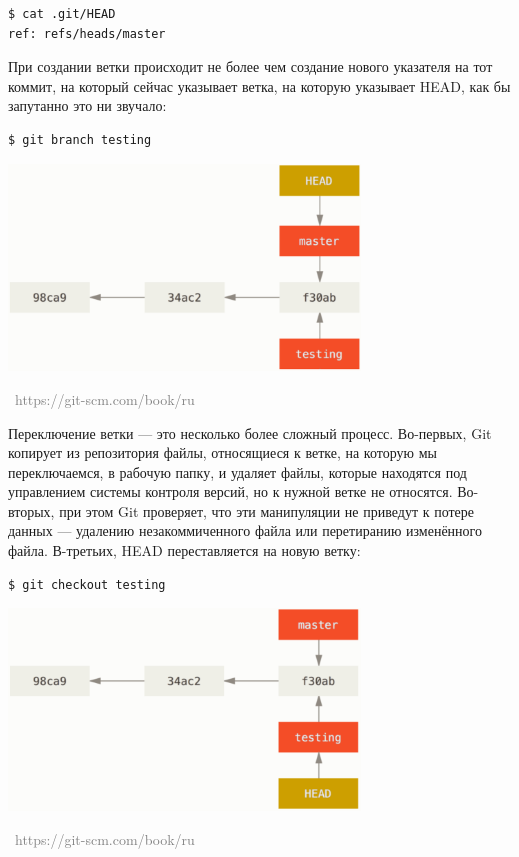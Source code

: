 \documentclass[a5paper]{article}
\newcommand{\attribution}[1] {
\vspace{-5mm}\begin{flushright}\begin{scriptsize}\textcolor{gray}{\textcopyright\, #1}\end{scriptsize}\end{flushright}
}
\begin{document}
\begin{verbatim}
$ cat .git/HEAD
ref: refs/heads/master
\end{verbatim}

При создании ветки происходит не более чем создание нового указателя на тот коммит, на который сейчас указывает ветка, на которую указывает HEAD, как бы запутанно это ни звучало:

\begin{verbatim}
$ git branch testing
\end{verbatim}

\begin{center}
	\includegraphics[width=0.7\textwidth]{creatingBranch.png}
	\attribution{https://git-scm.com/book/ru}
\end{center}

Переключение ветки --- это несколько более сложный процесс. Во-первых, Git копирует из репозитория файлы, относящиеся к ветке, на которую мы переключаемся, в рабочую папку, и удаляет файлы, которые находятся под управлением системы контроля версий, но к нужной ветке не относятся. Во-вторых, при этом Git проверяет, что эти манипуляции не приведут к потере данных --- удалению незакоммиченного файла или перетиранию изменённого файла. В-третьих, HEAD переставляется на новую ветку:

\begin{verbatim}
$ git checkout testing
\end{verbatim}

\begin{center}
	\includegraphics[width=0.7\textwidth]{checkout.png}
	\attribution{https://git-scm.com/book/ru}
\end{center}
\end{document}
